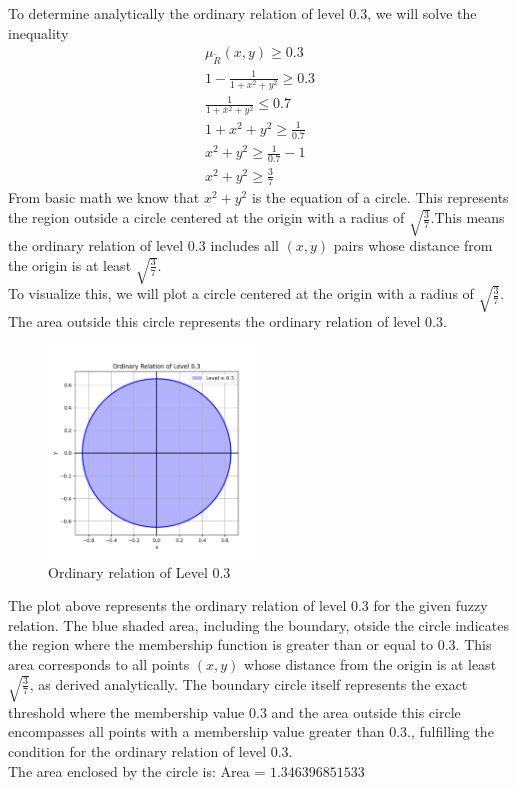 To determine analytically the ordinary relation of level $0.3$, we will solve the inequality
\begin{align*}
	\mu_{\tilde{R}}(x,y) \geq 0.3 \\
	1 - \frac{1}{1+x^2+y^2} \geq 0.3 \\
	\frac{1}{1+x^2+y^2} \leq 0.7 \\
	1 + x^2 + y^2 \geq \frac{1}{0.7} \\
	x^2 + y^2 \geq \frac{1}{0.7} - 1 \\
	x^2+y^2 \geq \frac{3}{7}
\end{align*}
From basic math we know that $	x^2 + y^2$ is the equation of a circle. This represents the region outside a circle centered at the origin with a radius of $\sqrt{\frac{3}{7}}$.This means the ordinary relation of level 
$0.3$ includes all $(x,y)$ pairs whose distance from the origin is at least 
$\sqrt{\frac{3}{7}}$.\\
To visualize this, we will plot a circle centered at the origin with a radius of 
$\sqrt{\frac{3}{7}}$.​
The area outside this circle represents the ordinary relation of level 
$0.3$.
\begin{figure}[H]
	\centering
	\includegraphics[width=0.5\textwidth]{../Problem 8/ordinary_plot.pdf}
	\caption{Ordinary relation of Level $0.3$}
\end{figure}
The plot above represents the ordinary relation of level $0.3$ for the given fuzzy relation. The blue shaded area, including the boundary, otside the circle indicates the region where the membership function is greater than or equal to 0.3. This area corresponds to all points $(x,y)$ whose distance from the origin is at least $\sqrt{\frac{3}{7}}$, as derived analytically. The boundary circle itself represents the exact threshold where the membership value $0.3$ and the area outside this circle encompasses all points with a membership value greater than $0.3$., fulfilling the condition for the ordinary relation of level 0.3. 
\\
The area enclosed by the circle is: Area = $1.346396851533$
